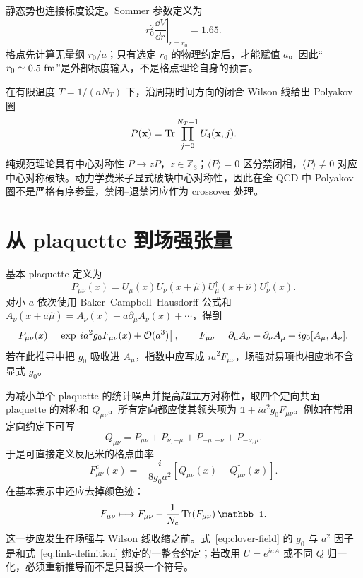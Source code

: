 静态势也连接标度设定。Sommer 参数定义为
\begin{equation}
  r_0^2\left.\frac{\dd V}{\dd r}\right|_{r=r_0}=1.65.
  \label{eq:sommer}
\end{equation}
格点先计算无量纲 \(r_0/a\)；只有选定 \(r_0\) 的物理约定后，才能赋值 \(a\)。因此“\(r_0\simeq0.5~{\rm fm}\)”是外部标度输入，不是格点理论自身的预言。

在有限温度 \(T=1/(aN_T)\) 下，沿周期时间方向的闭合 Wilson 线给出 Polyakov 圈
\begin{equation}
  P(\mathbf x)=\operatorname{Tr}\prod_{j=0}^{N_T-1}U_4(\mathbf x,j).
  \label{eq:polyakov}
\end{equation}
纯规范理论具有中心对称性 \(P\to zP\)，\(z\in\mathbb Z_3\)；\(\langle P\rangle=0\) 区分禁闭相，\(\langle P\rangle\ne0\) 对应中心对称破缺。动力学费米子显式破缺中心对称性，因此在全 QCD 中 Polyakov 圈不是严格有序参量，禁闭--退禁闭应作为 crossover 处理。

\section{从 plaquette 到场强张量}

基本 plaquette 定义为
\begin{equation}
  P_{\mu\nu}(x)=U_\mu(x)U_\nu(x+\hat\mu)
  U_\mu^\dagger(x+\hat\nu)U_\nu^\dagger(x).
  \label{eq:b01-plaquette}
\end{equation}
对小 \(a\) 依次使用 Baker--Campbell--Hausdorff 公式和 \(A_\nu(x+a\hat\mu)=A_\nu(x)+a\partial_\mu A_\nu(x)+\cdots\)，得到
\begin{equation}
  P_{\mu\nu}(x)
  =\exp\!\left[i a^2g_0F_{\mu\nu}(x)+\mathcal{O}(a^3)\right],
  \qquad
  F_{\mu\nu}=\partial_\mu A_\nu-\partial_\nu A_\mu
  +ig_0[A_\mu,A_\nu].
  \label{eq:plaquette-field-strength}
\end{equation}
若在此推导中把 \(g_0\) 吸收进 \(A_\mu\)，指数中应写成 \(i a^2F_{\mu\nu}\)，场强对易项也相应地不含显式 \(g_0\)。

为减小单个 plaquette 的统计噪声并提高超立方对称性，取四个定向共面 plaquette 的对称和 \(Q_{\mu\nu}\)。所有定向都应使其领头项为 \(\mathbb 1+i a^2g_0F_{\mu\nu}\)。例如在常用定向约定下可写
\begin{equation}
  Q_{\mu\nu}=P_{\mu\nu}+P_{\nu,-\mu}
  +P_{-\mu,-\nu}+P_{-\nu,\mu}.
  \label{eq:clover-sum}
\end{equation}
于是可直接定义反厄米的格点曲率
\begin{equation}
  F^{c}_{\mu\nu}(x)
  =-\frac{i}{8g_0a^2}
  \left[Q_{\mu\nu}(x)-Q_{\mu\nu}^\dagger(x)\right].
  \label{eq:clover-field}
\end{equation}
在基本表示中还应去掉颜色迹：
\begin{equation}
  F_{\mu\nu}\longmapsto
  F_{\mu\nu}-\frac1{N_c}\Tr(F_{\mu\nu})\,\mathbb 1 .
  \label{eq:traceless-field}
\end{equation}
这一步应发生在场强与 Wilson 线收缩之前。式~\eqref{eq:clover-field} 的 \(g_0\) 与 \(a^2\) 因子是和式~\eqref{eq:link-definition} 绑定的一整套约定；若改用 \(U=e^{iaA}\) 或不同 \(Q\) 归一化，必须重新推导而不是只替换一个符号。

